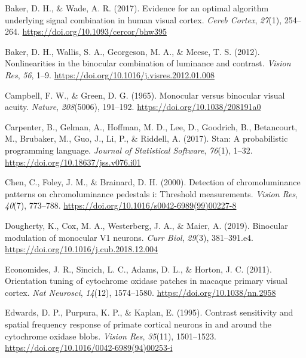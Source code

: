 \documentclass[
  letterpaper,
  DIV=11,
  numbers=noendperiod]{scrartcl}
\newlength{\cslhangindent}
\newlength{\cslentryspacingunit} %
\newenvironment{CSLReferences}[2] %
 {%
  \setlength{\parindent}{0pt}
  \ifodd #1
  \let\oldpar\par
  \def\par{\hangindent=\cslhangindent\oldpar}
  \fi
  \setlength{\parskip}{#2\cslentryspacingunit}
 }%
 {}
\begin{document}
\begin{CSLReferences}{1}{0}
\leavevmode{}%
Baker, D. H., \& Wade, A. R. (2017). Evidence for an optimal algorithm
underlying signal combination in human visual cortex. \emph{Cereb
Cortex}, \emph{27}(1), 254--264.
\url{https://doi.org/10.1093/cercor/bhw395}

\leavevmode{}%
Baker, D. H., Wallis, S. A., Georgeson, M. A., \& Meese, T. S. (2012).
Nonlinearities in the binocular combination of luminance and contrast.
\emph{Vision Res}, \emph{56}, 1--9.
\url{https://doi.org/10.1016/j.visres.2012.01.008}

\leavevmode{}%
Campbell, F. W., \& Green, D. G. (1965). Monocular versus binocular
visual acuity. \emph{Nature}, \emph{208}(5006), 191--192.
\url{https://doi.org/10.1038/208191a0}

\leavevmode{}%
Carpenter, B., Gelman, A., Hoffman, M. D., Lee, D., Goodrich, B.,
Betancourt, M., Brubaker, M., Guo, J., Li, P., \& Riddell, A. (2017).
Stan: A probabilistic programming language. \emph{Journal of Statistical
Software}, \emph{76}(1), 1--32.
\url{https://doi.org/10.18637/jss.v076.i01}

\leavevmode{}%
Chen, C., Foley, J. M., \& Brainard, D. H. (2000). Detection of
chromoluminance patterns on chromoluminance pedestals i: Threshold
measurements. \emph{Vision Res}, \emph{40}(7), 773--788.
\url{https://doi.org/10.1016/s0042-6989(99)00227-8}

\leavevmode{}%
Dougherty, K., Cox, M. A., Westerberg, J. A., \& Maier, A. (2019).
Binocular modulation of monocular V1 neurons. \emph{Curr Biol},
\emph{29}(3), 381--391.e4.
\url{https://doi.org/10.1016/j.cub.2018.12.004}

\leavevmode{}%
Economides, J. R., Sincich, L. C., Adams, D. L., \& Horton, J. C.
(2011). Orientation tuning of cytochrome oxidase patches in macaque
primary visual cortex. \emph{Nat Neurosci}, \emph{14}(12), 1574--1580.
\url{https://doi.org/10.1038/nn.2958}

\leavevmode{}%
Edwards, D. P., Purpura, K. P., \& Kaplan, E. (1995). Contrast
sensitivity and spatial frequency response of primate cortical neurons
in and around the cytochrome oxidase blobs. \emph{Vision Res},
\emph{35}(11), 1501--1523.
\url{https://doi.org/10.1016/0042-6989(94)00253-i}


\end{CSLReferences}
\end{document}
